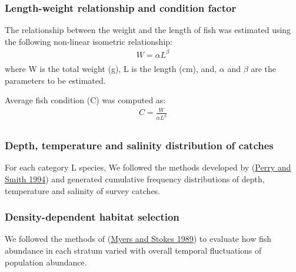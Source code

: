 \documentclass[12pt]{article}\usepackage[]{graphicx}\usepackage[]{color}
\begin{document}
\hypertarget{length-weight-relationship-and-condition-factor}{%
\subsubsection{Length-weight relationship and condition factor}\label{length-weight-relationship-and-condition-factor}}

The relationship between the weight and the length of fish was estimated using the following non-linear isometric relationship:
\begin{eqnarray*}\label{eqLengthWeight}
W = \alpha L ^\beta  
\\
\end{eqnarray*}
where W is the total weight (g), L is the length (cm), and, \(\alpha\) and \(\beta\) are the parameters to be estimated.

Average fish condition (C) was computed as:
\begin{eqnarray*}\label{eqCondition}
C = \frac{W}{\alpha L ^\beta}  
\\
\end{eqnarray*}
\hypertarget{depth-temperature-and-salinity-distribution-of-catches}{%
\subsubsection{Depth, temperature and salinity distribution of catches}\label{depth-temperature-and-salinity-distribution-of-catches}}

For each category L species, We followed the methods developed by (\protect\hyperlink{ref-Perry:Smith:1994:cjfas}{Perry and Smith 1994}) and generated cumulative frequency distributions of depth, temperature and salinity of survey catches.

\hypertarget{density-dependent-habitat-selection}{%
\subsubsection{Density-dependent habitat selection}\label{density-dependent-habitat-selection}}

We followed the methods of (\protect\hyperlink{ref-Myers:Stokes:1989}{Myers and Stokes 1989}) to evaluate how fish abundance in each stratum varied with overall temporal fluctuations of population abundance.
\end{document}
